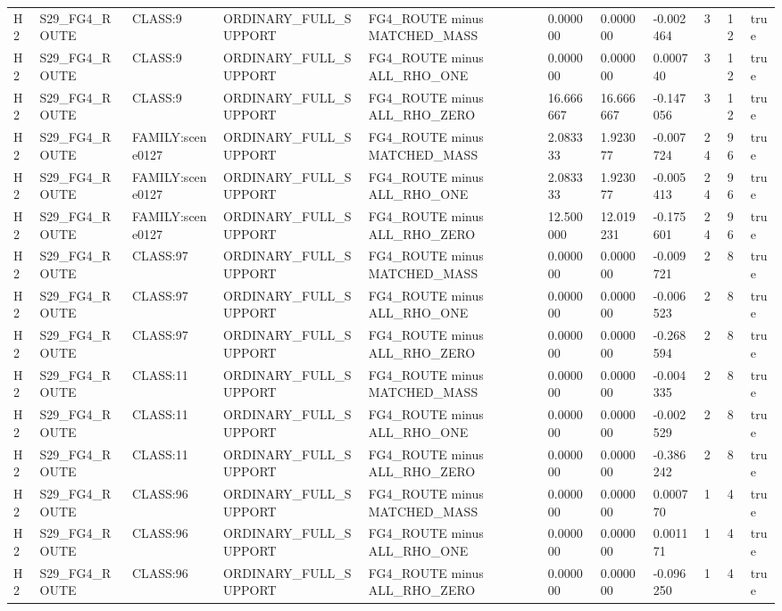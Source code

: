 \begin{tabular}{lllllllllll}
H2 & S29\_FG4\_ROUTE & CLASS:9 & ORDINARY\_FULL\_SUPPORT & FG4\_ROUTE minus MATCHED\_MASS & 0.000000 & 0.000000 & -0.002464 & 3 & 12 & true \\
H2 & S29\_FG4\_ROUTE & CLASS:9 & ORDINARY\_FULL\_SUPPORT & FG4\_ROUTE minus ALL\_RHO\_ONE & 0.000000 & 0.000000 & 0.000740 & 3 & 12 & true \\
H2 & S29\_FG4\_ROUTE & CLASS:9 & ORDINARY\_FULL\_SUPPORT & FG4\_ROUTE minus ALL\_RHO\_ZERO & 16.666667 & 16.666667 & -0.147056 & 3 & 12 & true \\
H2 & S29\_FG4\_ROUTE & FAMILY:scene0127 & ORDINARY\_FULL\_SUPPORT & FG4\_ROUTE minus MATCHED\_MASS & 2.083333 & 1.923077 & -0.007724 & 24 & 96 & true \\
H2 & S29\_FG4\_ROUTE & FAMILY:scene0127 & ORDINARY\_FULL\_SUPPORT & FG4\_ROUTE minus ALL\_RHO\_ONE & 2.083333 & 1.923077 & -0.005413 & 24 & 96 & true \\
H2 & S29\_FG4\_ROUTE & FAMILY:scene0127 & ORDINARY\_FULL\_SUPPORT & FG4\_ROUTE minus ALL\_RHO\_ZERO & 12.500000 & 12.019231 & -0.175601 & 24 & 96 & true \\
H2 & S29\_FG4\_ROUTE & CLASS:97 & ORDINARY\_FULL\_SUPPORT & FG4\_ROUTE minus MATCHED\_MASS & 0.000000 & 0.000000 & -0.009721 & 2 & 8 & true \\
H2 & S29\_FG4\_ROUTE & CLASS:97 & ORDINARY\_FULL\_SUPPORT & FG4\_ROUTE minus ALL\_RHO\_ONE & 0.000000 & 0.000000 & -0.006523 & 2 & 8 & true \\
H2 & S29\_FG4\_ROUTE & CLASS:97 & ORDINARY\_FULL\_SUPPORT & FG4\_ROUTE minus ALL\_RHO\_ZERO & 0.000000 & 0.000000 & -0.268594 & 2 & 8 & true \\
H2 & S29\_FG4\_ROUTE & CLASS:11 & ORDINARY\_FULL\_SUPPORT & FG4\_ROUTE minus MATCHED\_MASS & 0.000000 & 0.000000 & -0.004335 & 2 & 8 & true \\
H2 & S29\_FG4\_ROUTE & CLASS:11 & ORDINARY\_FULL\_SUPPORT & FG4\_ROUTE minus ALL\_RHO\_ONE & 0.000000 & 0.000000 & -0.002529 & 2 & 8 & true \\
H2 & S29\_FG4\_ROUTE & CLASS:11 & ORDINARY\_FULL\_SUPPORT & FG4\_ROUTE minus ALL\_RHO\_ZERO & 0.000000 & 0.000000 & -0.386242 & 2 & 8 & true \\
H2 & S29\_FG4\_ROUTE & CLASS:96 & ORDINARY\_FULL\_SUPPORT & FG4\_ROUTE minus MATCHED\_MASS & 0.000000 & 0.000000 & 0.000770 & 1 & 4 & true \\
H2 & S29\_FG4\_ROUTE & CLASS:96 & ORDINARY\_FULL\_SUPPORT & FG4\_ROUTE minus ALL\_RHO\_ONE & 0.000000 & 0.000000 & 0.001171 & 1 & 4 & true \\
H2 & S29\_FG4\_ROUTE & CLASS:96 & ORDINARY\_FULL\_SUPPORT & FG4\_ROUTE minus ALL\_RHO\_ZERO & 0.000000 & 0.000000 & -0.096250 & 1 & 4 & true \\

\end{tabular}
